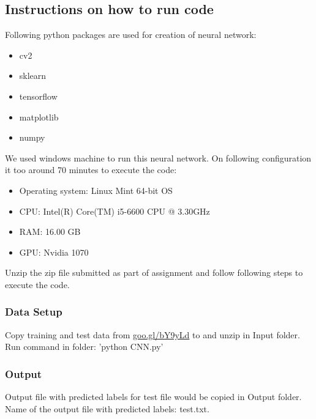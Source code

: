 \documentclass[fleqn,10pt]{SelfArx} %
\begin{document}
\subsection{Instructions on how to run code}
Following python packages are used for creation of neural network:
\begin{itemize}
\itemsep0em
  \item cv2
  \item sklearn
  \item tensorflow
  \item matplotlib
  \item numpy
\end{itemize}
We used windows machine to run this neural network. On following configuration it too around 70 minutes to execute the code:
\begin{itemize}
\itemsep0em
  \item Operating system: Linux Mint 64-bit OS
  \item CPU: Intel(R) Core(TM) i5-6600 CPU @ 3.30GHz
  \item RAM: 16.00 GB
  \item GPU: Nvidia 1070
\end{itemize}
Unzip the zip file submitted as part of assignment and follow following steps to execute the code.
\subsubsection{Data Setup}
Copy training and test data from \url{goo.gl/bY9yLd} to and unzip in Input folder.
\newline
Run command in  folder: 'python CNN.py'

\subsubsection{Output}
Output file with predicted labels for test file would be copied in Output folder. Name of the output file with predicted labels: test.txt.
\end{document}
